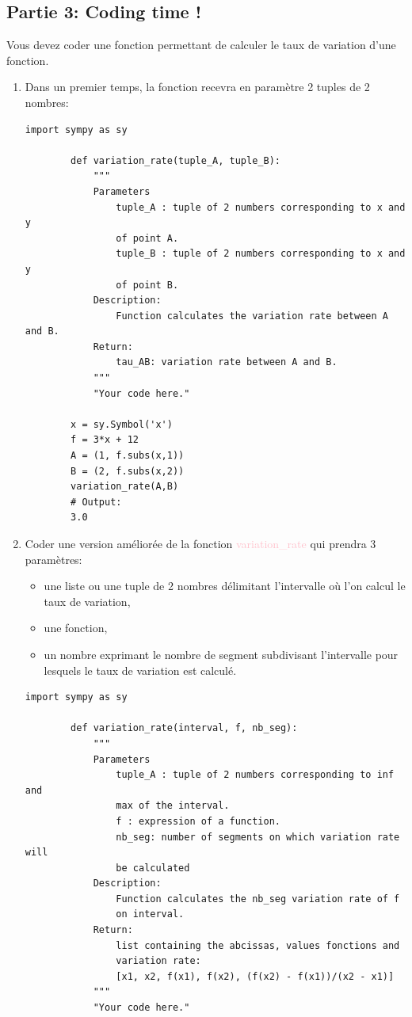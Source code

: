 \documentclass[11pt, french]{article}
\newcommand{\inlsnippet}[1]{\colorbox{gray!10}{\mbox{\textcolor{pink}{#1}}}}
\begin{document}
\subsection*{Partie 3: Coding time !}
Vous devez coder une fonction permettant de calculer le taux de variation d'une fonction.
\begin{enumerate}
    \item Dans un premier temps, la fonction recevra en paramètre 2 tuples de 2 nombres:
    \begin{lstlisting}[style=nightly]
        import sympy as sy
        
        def variation_rate(tuple_A, tuple_B):
            """
            Parameters
                tuple_A : tuple of 2 numbers corresponding to x and y
                of point A.
                tuple_B : tuple of 2 numbers corresponding to x and y
                of point B.
            Description:
                Function calculates the variation rate between A and B.
            Return:
                tau_AB: variation rate between A and B.
            """
            "Your code here."
        
        x = sy.Symbol('x')
        f = 3*x + 12
        A = (1, f.subs(x,1))
        B = (2, f.subs(x,2))
        variation_rate(A,B)
        # Output:
        3.0
    \end{lstlisting}
    \item Coder une version améliorée de la fonction \inlsnippet{variation_rate} qui prendra 3 paramètres:
    \begin{itemize}
        \item une liste ou une tuple de 2 nombres délimitant l'intervalle où l'on calcul le taux de variation,
        \item une fonction,
        \item un nombre exprimant le nombre de segment subdivisant l'intervalle pour lesquels le taux de variation est calculé.
    \end{itemize}
    \begin{lstlisting}[style=nightly]
        import sympy as sy
        
        def variation_rate(interval, f, nb_seg):
            """
            Parameters
                tuple_A : tuple of 2 numbers corresponding to inf and
                max of the interval.
                f : expression of a function.
                nb_seg: number of segments on which variation rate will
                be calculated
            Description:
                Function calculates the nb_seg variation rate of f
                on interval.
            Return:
                list containing the abcissas, values fonctions and
                variation rate:
                [x1, x2, f(x1), f(x2), (f(x2) - f(x1))/(x2 - x1)]
            """
            "Your code here."
        

\end{lstlisting}
\end{enumerate}
\end{document}
